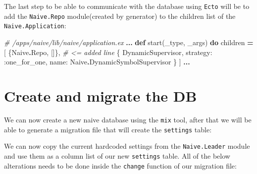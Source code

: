 \documentclass[
]{book}
\newenvironment{Shaded}{\begin{snugshade}}{\end{snugshade}}
\newcommand{\AttributeTok}[1]{\textcolor[rgb]{0.77,0.63,0.00}{#1}}
\newcommand{\CommentTok}[1]{\textcolor[rgb]{0.56,0.35,0.01}{\textit{#1}}}
\newcommand{\ConstantTok}[1]{\textcolor[rgb]{0.00,0.00,0.00}{#1}}
\newcommand{\ExtensionTok}[1]{#1}
\newcommand{\KeywordTok}[1]{\textcolor[rgb]{0.13,0.29,0.53}{\textbf{#1}}}
\newcommand{\NormalTok}[1]{#1}
\newcommand{\OperatorTok}[1]{\textcolor[rgb]{0.81,0.36,0.00}{\textbf{#1}}}
\newcommand{\VariableTok}[1]{\textcolor[rgb]{0.00,0.00,0.00}{#1}}
\begin{document}
The last step to be able to communicate with the database using \texttt{Ecto} will be to add the \texttt{Naive.Repo} module(created by generator) to the children list of the \texttt{Naive.Application}:

\begin{Shaded}
\begin{Highlighting}[]
\CommentTok{\# /apps/naive/lib/naive/application.ex}
\OperatorTok{...}
  \KeywordTok{def}\NormalTok{ start(\_type, \_args) }\KeywordTok{do}
\NormalTok{    children }\OperatorTok{=}\NormalTok{ [}
\NormalTok{      \{}\ConstantTok{Naive}\OperatorTok{.}\ConstantTok{Repo}\NormalTok{, []\}, }\CommentTok{\# \textless{}= added line}
\NormalTok{      \{}
        \ConstantTok{DynamicSupervisor}\NormalTok{,}
        \VariableTok{strategy:} \VariableTok{:one\_for\_one}\NormalTok{, }\VariableTok{name:} \ConstantTok{Naive}\OperatorTok{.}\ConstantTok{DynamicSymbolSupervisor}
\NormalTok{      \}}
\NormalTok{    ]}
    \OperatorTok{...}
\end{Highlighting}
\end{Shaded}

\hypertarget{create-and-migrate-the-db}{%
\section{Create and migrate the DB}\label{create-and-migrate-the-db}}

We can now create a new naive database using the \texttt{mix} tool, after that we will be able to generate a migration file that will create the \texttt{settings} table:

\begin{Shaded}
\end{Shaded}

We can now copy the current hardcoded settings from the \texttt{Naive.Leader} module and use them as a column list of our new \texttt{settings} table. All of the below alterations needs to be done inside the \texttt{change} function of our migration file:
\end{document}
